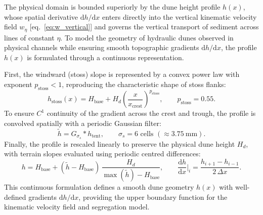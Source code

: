 \documentclass[lineno]{JFM-FLM_Au}
\begin{document}
The physical domain is bounded superiorly by the dune height profile $h(x)$, whose spatial derivative $\mathrm{d}h/\mathrm{d}x$ enters directly into the vertical kinematic velocity field $w_\eta$ [eq.~\eqref{eq:w_vertical}] and governs the vertical transport of sediment across lines of constant $\eta$. To model the geometry of hydraulic dunes observed in physical channels while ensuring smooth topographic gradients $\mathrm{d}h/\mathrm{d}x$, the profile $h(x)$ is formulated through a continuous representation.

First, the windward (stoss) slope is represented by a convex power law with exponent $p_{\mathrm{stoss}} < 1$, reproducing the characteristic shape of stoss flanks:
\begin{equation}
    h_{\mathrm{stoss}}(x) = H_{\mathrm{base}} + H_d \left(\frac{x}{x_{\mathrm{crest}}}\right)^{p_{\mathrm{stoss}}}, \qquad p_{\mathrm{stoss}} = 0.55.
    \label{eq:hstoss}
\end{equation}
To ensure $C^1$ continuity of the gradient across the crest and trough, the profile is convolved spatially with a periodic Gaussian filter:
\begin{equation}
    \tilde h = G_{\sigma_s} * h_{\mathrm{tent}}, \qquad \sigma_s = 6 \text{ cells } (\approx 3.75~\mathrm{mm}).
    \label{eq:gaussian_smooth}
\end{equation}
Finally, the profile is rescaled linearly to preserve the physical dune height $H_d$, with terrain slopes evaluated using periodic centred differences:
\begin{equation}
    h = H_{\mathrm{base}} + (\tilde h - H_{\mathrm{base}})\, \frac{H_d}{\max(\tilde h)-H_{\mathrm{base}}}, \qquad
    \frac{\mathrm{d}h}{\mathrm{d}x}\bigg|_i = \frac{h_{i+1}-h_{i-1}}{2\,\Delta x}.
    \label{eq:rescale}
\end{equation}
This continuous formulation defines a smooth dune geometry $h(x)$ with well-defined gradients $\mathrm{d}h/\mathrm{d}x$, providing the upper boundary function for the kinematic velocity field and segregation model.



\end{document}

